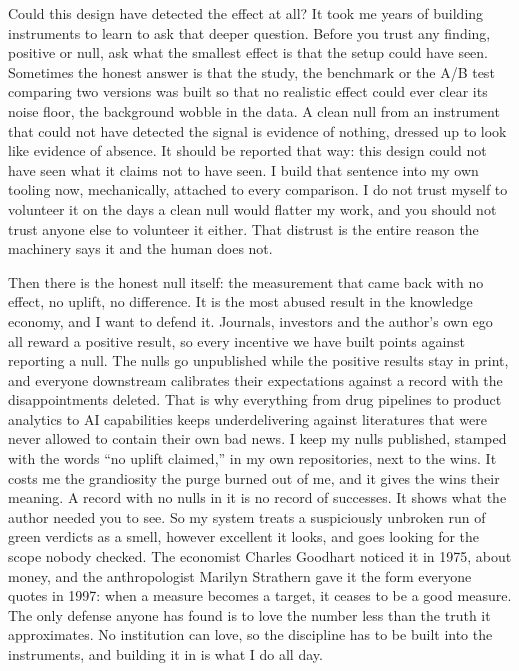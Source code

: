 \documentclass[11pt]{article}
\begin{document}
Could this design have detected the effect at all? It took me years of building instruments to learn to ask that deeper question. Before you trust any finding, positive or null, ask what the smallest effect is that the setup could have seen. Sometimes the honest answer is that the study, the benchmark or the A/\allowbreak{}B test comparing two versions was built so that no realistic effect could ever clear its noise floor, the background wobble in the data. A clean null from an instrument that could not have detected the signal is evidence of nothing, dressed up to look like evidence of absence. It should be reported that way: this design could not have seen what it claims not to have seen. I build that sentence into my own tooling now, mechanically, attached to every comparison. I do not trust myself to volunteer it on the days a clean null would flatter my work, and you should not trust anyone else to volunteer it either. That distrust is the entire reason the machinery says it and the human does not.

Then there is the honest null itself: the measurement that came back with no effect, no uplift, no difference. It is the most abused result in the knowledge economy, and I want to defend it. Journals, investors and the author's own ego all reward a positive result, so every incentive we have built points against reporting a null. The nulls go unpublished while the positive results stay in print, and everyone downstream calibrates their expectations against a record with the disappointments deleted. That is why everything from drug pipelines to product analytics to AI capabilities keeps underdelivering against literatures that were never allowed to contain their own bad news. I keep my nulls published, stamped with the words ``no uplift claimed,'' in my own repositories, next to the wins. It costs me the grandiosity the purge burned out of me, and it gives the wins their meaning. A record with no nulls in it is no record of successes. It shows what the author needed you to see. So my system treats a suspiciously unbroken run of green verdicts as a smell, however excellent it looks, and goes looking for the scope nobody checked. The economist Charles Goodhart noticed it in 1975, about money, and the anthropologist Marilyn Strathern gave it the form everyone quotes in 1997: when a measure becomes a target, it ceases to be a good measure. The only defense anyone has found is to love the number less than the truth it approximates. No institution can love, so the discipline has to be built into the instruments, and building it in is what I do all day.
\end{document}
